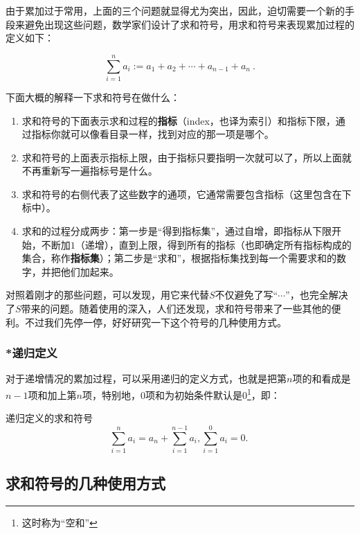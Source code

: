 由于累加过于常用，上面的三个问题就显得尤为突出，因此，迫切需要一个新的手段来避免出现这些问题，数学家们设计了求和符号，用求和符号来表现累加过程的定义如下：

\begin{equation}\label{eq_SumSym_1}
\sum_{i=1}^n a_i:=a_1+a_2+\cdots+a_{n-1}+a_{n}~.
\end{equation}


下面大概的解释一下求和符号在做什么：
\begin{enumerate}
\item 求和符号的下面表示求和过程的\textbf{指标}（index，也译为索引）和指标下限，通过指标你就可以像看目录一样，找到对应的那一项是哪个。
\item 求和符号的上面表示指标上限，由于指标只要指明一次就可以了，所以上面就不再重新写一遍指标号是什么。
\item 求和符号的右侧代表了这些数字的通项，它通常需要包含指标（这里包含在下标中）。
\item 求和的过程分成两步：第一步是“得到指标集”，通过自增，即指标从下限开始，不断加$1$（递增），直到上限，得到所有的指标（也即确定所有指标构成的集合，称作\textbf{指标集}）；第二步是“求和”，根据指标集找到每一个需要求和的数字，并把他们加起来。
\end{enumerate}

对照着刚才的那些问题，可以发现，用它来代替$S$不仅避免了写“$\cdots$”，也完全解决了$S$带来的问题。随着使用的深入，人们还发现，求和符号带来了一些其他的便利。不过我们先停一停，好好研究一下这个符号的几种使用方式。

\subsubsection{*递归定义}

对于递增情况的累加过程，可以采用递归的定义方式，也就是把第$n$项的和看成是$n-1$项和加上第$n$项，特别地，$0$项和为初始条件默认是0\footnote{这时称为“空和”}，即：

\begin{definition}{递归定义的求和符号}
\begin{equation}
\sum_{i=1}^n a_i = a_n + \sum_{i=1}^{n-1} a_i,\sum_{i=1}^0 a_i=0.~
\end{equation}
\end{definition}


\subsection{求和符号的几种使用方式}

